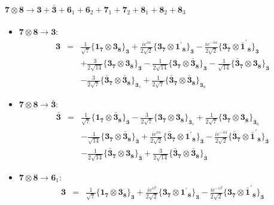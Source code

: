\documentclass[english]{article}
\newcommand{\subcg}[3]{\big\{ {#1}\otimes{#2}\big\}^{}_{#3}}
\newcommand{\rep}[1]{\mathbf{#1}}
\begin{document}
\paragraph*{\Large $\rep{7}\otimes\rep{8}\to\rep{3}+\rep{\bar{3}}+\rep{6}_{1}+\rep{6}_{2}+\rep{7}_{1}+\rep{7}_{2}+\rep{8}_{1}+\rep{8}_{2}+\rep{8}_{3}$}
\begin{itemize}
\item $\rep{7}\otimes\rep{8}\to\rep{3}$:
\begin{eqnarray*}
\rep{3} &=& \frac{1}{\sqrt{7}}\subcg{\rep{1}_{\rep{7}}}{\rep{3}_{\rep{8}}}{\rep{3}}+\frac{i e^{i \alpha }}{2 \sqrt{2}}\subcg{\rep{3}_{\rep{7}}}{\rep{1^{\prime}}_{\rep{8}}}{\rep{3}}-\frac{i e^{-i \alpha }}{2 \sqrt{2}}\subcg{\rep{3}_{\rep{7}}}{\rep{\bar{1}^{\prime}}_{\rep{8}}}{\rep{3}} \\ 
 & & +\frac{3}{2 \sqrt{14}}\subcg{\rep{3}_{\rep{7}}}{\rep{3}_{\rep{8}}}{\rep{3}}-\frac{1}{2 \sqrt{14}}\subcg{\rep{3}_{\rep{7}}}{\rep{\bar{3}}_{\rep{8}}}{\rep{3}}-\frac{1}{\sqrt{14}}\subcg{\rep{\bar{3}}_{\rep{7}}}{\rep{3}_{\rep{8}}}{\rep{3}} \\ 
 & & -\frac{3}{2 \sqrt{7}}\subcg{\rep{\bar{3}}_{\rep{7}}}{\rep{\bar{3}}_{\rep{8}}}{\rep{3}_{s}}+\frac{1}{2 \sqrt{7}}\subcg{\rep{\bar{3}}_{\rep{7}}}{\rep{\bar{3}}_{\rep{8}}}{\rep{3}_{a}}
\end{eqnarray*}
\item $\rep{7}\otimes\rep{8}\to\rep{\bar{3}}$:
\begin{eqnarray*}
\rep{\bar{3}} &=& \frac{1}{\sqrt{7}}\subcg{\rep{1}_{\rep{7}}}{\rep{\bar{3}}_{\rep{8}}}{\rep{\bar{3}}}-\frac{3}{2 \sqrt{7}}\subcg{\rep{3}_{\rep{7}}}{\rep{3}_{\rep{8}}}{\rep{\bar{3}}_{s}}+\frac{1}{2 \sqrt{7}}\subcg{\rep{3}_{\rep{7}}}{\rep{3}_{\rep{8}}}{\rep{\bar{3}}_{a}} \\ 
 & & -\frac{1}{\sqrt{14}}\subcg{\rep{3}_{\rep{7}}}{\rep{\bar{3}}_{\rep{8}}}{\rep{\bar{3}}}+\frac{i e^{i \alpha }}{2 \sqrt{2}}\subcg{\rep{\bar{3}}_{\rep{7}}}{\rep{1^{\prime}}_{\rep{8}}}{\rep{\bar{3}}}-\frac{i e^{-i \alpha }}{2 \sqrt{2}}\subcg{\rep{\bar{3}}_{\rep{7}}}{\rep{\bar{1}^{\prime}}_{\rep{8}}}{\rep{\bar{3}}} \\ 
 & & -\frac{1}{2 \sqrt{14}}\subcg{\rep{\bar{3}}_{\rep{7}}}{\rep{3}_{\rep{8}}}{\rep{\bar{3}}}+\frac{3}{2 \sqrt{14}}\subcg{\rep{\bar{3}}_{\rep{7}}}{\rep{\bar{3}}_{\rep{8}}}{\rep{\bar{3}}}
\end{eqnarray*}
\item $\rep{7}\otimes\rep{8}\to\rep{6}_{1}$:
\begin{eqnarray*}
\rep{3} &=& \frac{1}{\sqrt{7}}\subcg{\rep{1}_{\rep{7}}}{\rep{3}_{\rep{8}}}{\rep{3}}+\frac{i e^{i \beta }}{2 \sqrt{2}}\subcg{\rep{3}_{\rep{7}}}{\rep{1^{\prime}}_{\rep{8}}}{\rep{3}}-\frac{i e^{-i \beta }}{2 \sqrt{2}}\subcg{\rep{3}_{\rep{7}}}{\rep{\bar{1}^{\prime}}_{\rep{8}}}{\rep{3}} \\ 

\end{eqnarray*}
\end{itemize}
\end{document}
